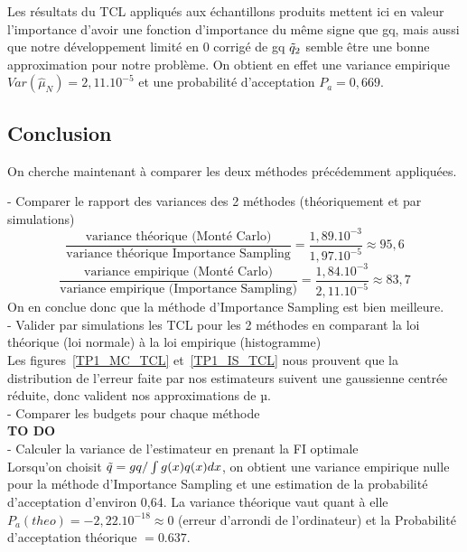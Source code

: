 \documentclass{article}
\begin{document}
Les résultats du TCL appliqués aux échantillons produits mettent ici en valeur l'importance d'avoir une fonction d'importance du même signe que gq, mais aussi que notre développement limité en 0 corrigé de gq $\Tilde{q}_2$  semble être une bonne approximation pour notre problème. On obtient en effet une variance empirique $Var(\hat{\mu}_N) = 2,11.10^{-5} $ et une probabilité d'acceptation $P_a = 0,669$.



\subsection{Conclusion}
On cherche maintenant à comparer les deux méthodes précédemment appliquées.

- Comparer le rapport des variances des 2 méthodes (théoriquement et par simulations)\\
$$\frac{\textrm{variance théorique (Monté Carlo)}}{\textrm{variance théorique Importance Sampling}} = \frac{1,89.10^{-3}}{1,97.10^{-5}} \approx 95,6 $$
$$\frac{\textrm{variance empirique (Monté Carlo)}}{\textrm{variance empirique (Importance Sampling)}} = \frac{1,84.10^{-3}}{2,11.10^{-5}} \approx 83,7 $$
On en conclue donc que la méthode d'Importance Sampling est bien meilleure.\\

- Valider par simulations les TCL pour les 2 méthodes en comparant la loi théorique (loi normale) à la loi empirique (histogramme)\\
Les figures~\ref{TP1_MC_TCL} et~\ref{TP1_IS_TCL} nous prouvent que la distribution de l'erreur faite par nos estimateurs suivent une gaussienne centrée réduite, donc valident nos approximations de µ.\\

- Comparer les budgets pour chaque méthode\\
\textbf{TO DO}\\

- Calculer la variance de l’estimateur en prenant la FI optimale\\
Lorsqu'on choisit $\Tilde{q}=gq/ \int g(x)q(x)dx$, on obtient une variance empirique nulle pour la méthode d'Importance Sampling et une estimation de la probabilité d'acceptation d'environ 0,64. La variance théorique vaut quant à elle $P_a(theo)=-2,22.10^{-18}\approx 0$ (erreur d'arrondi de l'ordinateur) et la Probabilité d'acceptation théorique $=0.637$.\\
\end{document}
